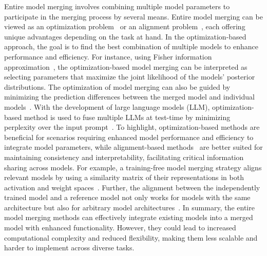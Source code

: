 Entire model merging involves combining multiple model parameters to participate in the merging process by several means. Entire model merging can be viewed as an optimization problem~\cite{Matena_Raffel_2021, jin2022dataless, mavromatis2024packllm} or an alignment problem~\cite{ainsworth2022git, jordan2022repair, xu2024training, ainsworth2022git}, each offering unique advantages depending on the task at hand.
In the optimization-based approach, the goal is to find the best combination of multiple models to enhance performance and efficiency. For instance, using Fisher information approximation~\cite{Matena_Raffel_2021}, the optimization-based model merging can be interpreted as selecting parameters that maximize the joint likelihood of the models' posterior distributions. The optimization of model merging can also be guided by minimizing the prediction differences between the merged model and individual models~\cite{jin2022dataless}. 
With the development of large language models (LLM), optimization-based method is used to fuse multiple LLMs at test-time by minimizing perplexity over the input prompt~\cite{mavromatis2024packllm}.
To highlight, optimization-based methods are beneficial for scenarios requiring enhanced model performance and efficiency to integrate model parameters, while alignment-based methods~\cite{ainsworth2022git, jordan2022repair} are better suited for maintaining consistency and interpretability, facilitating critical information sharing across models.
For example, a training-free model merging strategy aligns relevant models by using a similarity matrix of their representations in both activation and weight spaces~\cite{xu2024training}.
Further, the alignment between the independently trained model and a reference model not only works for models with the same architecture but also for arbitrary model architectures~\cite{ainsworth2022git}.
In summary, the entire model merging methods can effectively integrate existing models into a merged model with enhanced functionality. However, they could lead to increased computational complexity and reduced flexibility, making them less scalable and harder to implement across diverse tasks.

